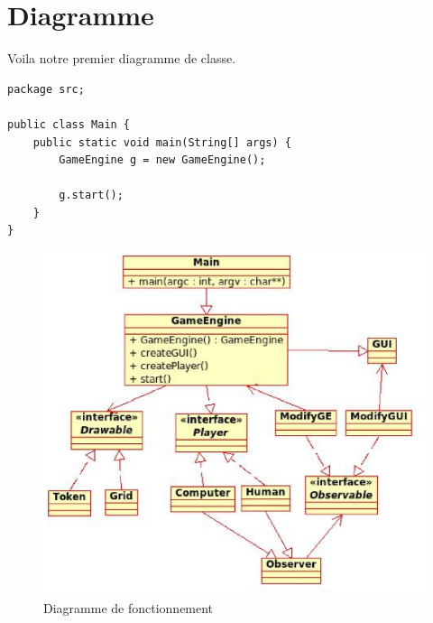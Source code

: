 
\section{Diagramme}

Voila notre premier diagramme de classe. 

\begin{verbatim}
package src;

public class Main {
	public static void main(String[] args) {
		GameEngine g = new GameEngine();

		g.start();
	}
}
\end{verbatim}


\begin{figure}[!h]
\begin{center}
  \includegraphics[scale = 0.8]{diagramme}
  \caption{Diagramme de fonctionnement}
  \label{diagramme}
\end{center}
\end{figure}
